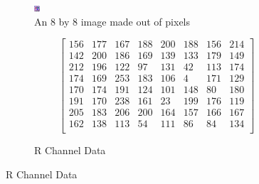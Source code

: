 \documentclass{article}
\begin{document}
\begin{figure}[h]
\tiny
\begin{subfigure}{0.5\textwidth}
\begin{center}
	\includegraphics[width=\linewidth]{./implementation/Photos/art.png}
\end{center}
\caption{An 8 by 8 image made out of pixels}
\end{subfigure}
\begin{subfigure}{0.5\textwidth}
\begin{equation*}
\begin{bmatrix}
	156 & 177 & 167 & 188 & 200 & 188 & 156 & 214 \\
	142 & 200 & 186 & 169 & 139 & 133 & 179 & 149 \\
	212 & 196 & 122 &  97 & 131 &  42 & 113 & 174 \\
	174 & 169 & 253 & 183 & 106 &   4 & 171 & 129 \\
	170 & 174 & 191 & 124 & 101 & 148 &  80 & 180 \\
	191 & 170 & 238 & 161 &  23 & 199 & 176 & 119 \\
	205 & 183 & 206 & 200 & 164 & 157 & 166 & 167 \\
	162 & 138 & 113 &  54 & 111 &  86 &  84 & 134 \\
\end{bmatrix}
\end{equation*}
\caption{R Channel Data}
\end{subfigure}


\end{figure}
\end{document}
